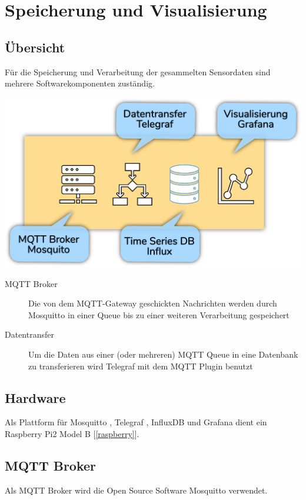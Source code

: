 \documentclass[
  12pt, %
  a4paper, %
  oneside, %
  openany, 
  numbers=noenddot, %
  BCOR=5mm, %
  parskip=half*, %
  thesis, %
]{bfhbook}
\begin{document}
\chapter{Speicherung und Visualisierung}
\section{Übersicht}
Für die Speicherung und Verarbeitung der gesammelten Sensordaten sind mehrere Softwarekomponenten zuständig.
\begin{center}
\includegraphics[width=17cm, left]{Bilder/Raspberry-Software.png}%
\label{labelname}%
\end{center}
 \begin{description}
\item[MQTT Broker] Die von dem MQTT-Gateway geschickten Nachrichten werden durch Mosquitto \cite{mosquitto} in einer Queue bis zu einer weiteren Verarbeitung gespeichert
\item[Datentransfer] Um die Daten aus einer (oder mehreren) MQTT Queue in eine Datenbank zu transferieren wird Telegraf \cite{telegraf} mit dem MQTT Plugin benutzt \cite{telegrafmqtt}
\end{description}
\section{Hardware}
Als Plattform für Mosquitto \cite{mosquitto}, Telegraf \cite{telegraf}, InfluxDB \cite{influx} und Grafana \cite{grafana} dient ein Raspberry Pi2 Model B [\ref{raspberry}].
\section{MQTT Broker}
Als MQTT Broker wird die Open Source Software Mosquitto \cite{mosquitto} verwendet.
\end{document}

